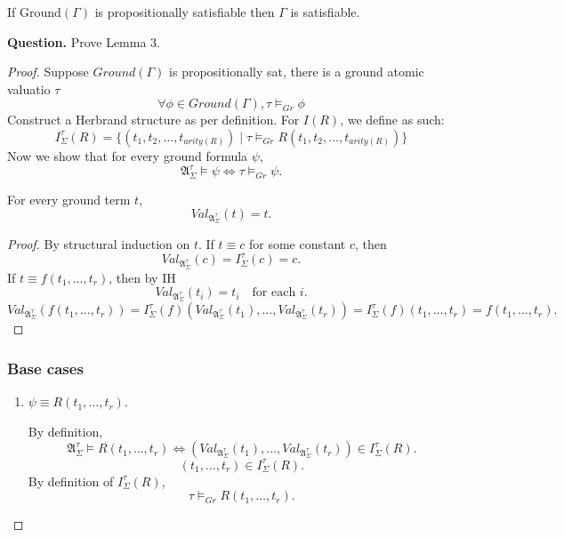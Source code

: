 \documentclass{article}
\newtheorem{lemma}[theorem]{Lemma}
\let\oldlemma\lemma
\let\endoldlemma\endlemma
\renewenvironment{lemma}
  {\begin{tcolorbox}[
      colback=green!8,
      colframe=green!50!black,
      boxrule=0.6pt,
      arc=2pt,
      left=6pt,right=6pt,top=4pt,bottom=4pt
    ]\oldlemma}
  {\endoldlemma\end{tcolorbox}}
\begin{document}
\begin{lemma}
If $\mathrm{Ground}(\Gamma)$ is propositionally satisfiable then $\Gamma$ is satisfiable.
\end{lemma}

\textbf{Question.} Prove Lemma 3.
\begin{proof}
    Suppose $Ground(\Gamma)$ is propositionally sat, there is a ground atomic valuatio $\tau$
    \[
    \forall \phi \in Ground(\Gamma), \tau \models_{Gr} \phi 
    \]
    Construct a Herbrand structure as per definition. For $I(R)$, we define as such:
    \[I_\Sigma^\tau(R) = \{(t_1, t_2, \dots, t_{arity(R)})  \mid \tau\models_{Gr} R(t_1, t_2, \dots, t_{arity(R)}) \}\]
    Now we show that for every ground formula $\psi$,
    \[
    \mathfrak{A}^\tau_\Sigma \models \psi \iff \tau \models_{Gr} \psi.
    \]
    
    \begin{lemma}
    For every ground term $t$,
    \[
    Val_{\mathfrak{A}^\tau_\Sigma}(t)=t.
    \]
    \end{lemma}
    
    \begin{proof}
    By structural induction on $t$.
    If $t\equiv c$ for some constant $c$, then
    \[
    Val_{\mathfrak{A}^\tau_\Sigma}(c)=I^\tau_\Sigma(c)=c.
    \]
    If $t\equiv f(t_1,\dots,t_r)$, then by IH
    \[
    Val_{\mathfrak{A}^\tau_\Sigma}(t_i)=t_i
    \quad\text{for each }i.
    \]
    \[
    Val_{\mathfrak{A}^\tau_\Sigma}(f(t_1,\dots,t_r))
    =
    I^\tau_\Sigma(f)(Val_{\mathfrak{A}^\tau_\Sigma}(t_1),\dots,Val_{\mathfrak{A}^\tau_\Sigma}(t_r))
    =
    I^\tau_\Sigma(f)(t_1,\dots,t_r)
    =
    f(t_1,\dots,t_r).
    \]
    \end{proof}
    \subsubsection*{Base cases}
    \begin{enumerate}
        \item $\psi \equiv R(t_1,\dots,t_r)$.
    
        By definition,
        \[
        \mathfrak{A}^\tau_\Sigma \models R(t_1,\dots,t_r)
        \iff
        (Val_{\mathfrak{A}^\tau_\Sigma}(t_1),\dots,Val_{\mathfrak{A}^\tau_\Sigma}(t_r))\in I^\tau_\Sigma(R).
        \]
        \[
        (t_1,\dots,t_r)\in I^\tau_\Sigma(R).
        \]
        By definition of $I^\tau_\Sigma(R)$, 
        \[
        \tau \models_{Gr} R(t_1,\dots,t_r).
        \]
    \end{enumerate}
    

\end{proof}
\end{document}

